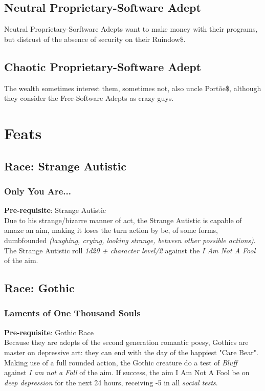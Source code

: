 \documentclass[ letterpaper,12pt]{article}
\begin{document}
\subsection{Neutral Proprietary-Software Adept} Neutral Proprietary-Sorftware Adepts want to make money with their programs, but distrust of the absence of security on their Ruindow\$.
\subsection{Chaotic Proprietary-Software Adept} The wealth sometimes interest them, sometimes not, also uncle Portõe\$, although they consider the Free-Software Adepts as crazy guys.


\section{Feats}

\subsection{Race: Strange Autistic}

\subsubsection{Only You Are...}
 {\bf Pre-requisite}: Strange Autistic\\
Due to his strange/bizarre manner of act, the Strange Autistic is capable of amaze an aim, making it loses the turn action by be, of some forms, dumbfounded {\it (laughing, crying, looking strange, between other possible actions)}.  The Strange Autistic roll {\it 1d20 + character level/2} against the {\it I Am Not A Fool} of the aim.

\subsection{Race: Gothic}

\subsubsection{Laments of One Thousand Souls}
{\bf Pre-requisite}: Gothic Race\\
Because they are adepts of the second generation romantic poesy, Gothics are master on depressive art: they can end with the day of the happiest "Care Bear". Making use of a full rounded action, the Gothic creature do a test of {\it Bluff} against {\it I am not a Foll} of the aim. If success, the aim I Am Not A Fool be on {\it deep depression} for the next 24 hours, receiving -5 in all {\it social tests}.
\end{document}
